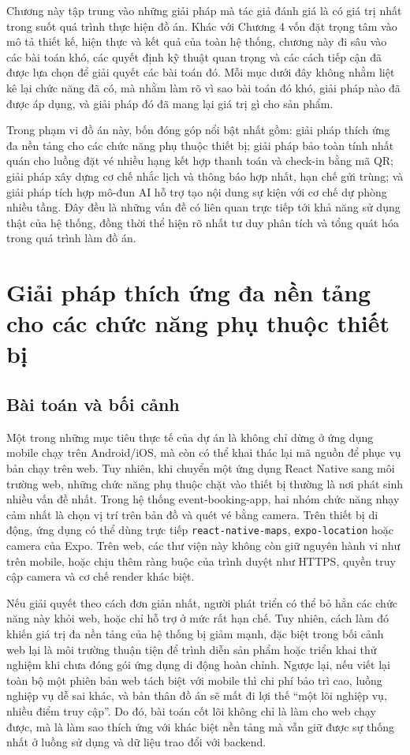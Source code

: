 \documentclass[../DoAn.tex]{subfiles}
\begin{document}
Chương này tập trung vào những giải pháp mà tác giả đánh giá là có giá trị nhất trong suốt quá trình thực hiện đồ án. Khác với Chương 4 vốn đặt trọng tâm vào mô tả thiết kế, hiện thực và kết quả của toàn hệ thống, chương này đi sâu vào các bài toán khó, các quyết định kỹ thuật quan trọng và các cách tiếp cận đã được lựa chọn để giải quyết các bài toán đó. Mỗi mục dưới đây không nhằm liệt kê lại chức năng đã có, mà nhằm làm rõ vì sao bài toán đó khó, giải pháp nào đã được áp dụng, và giải pháp đó đã mang lại giá trị gì cho sản phẩm.

Trong phạm vi đồ án này, bốn đóng góp nổi bật nhất gồm: giải pháp thích ứng đa nền tảng cho các chức năng phụ thuộc thiết bị; giải pháp bảo toàn tính nhất quán cho luồng đặt vé nhiều hạng kết hợp thanh toán và check-in bằng mã \gls{QR}; giải pháp xây dựng cơ chế nhắc lịch và thông báo hợp nhất, hạn chế gửi trùng; và giải pháp tích hợp mô-đun AI hỗ trợ tạo nội dung sự kiện với cơ chế dự phòng nhiều tầng. Đây đều là những vấn đề có liên quan trực tiếp tới khả năng sử dụng thật của hệ thống, đồng thời thể hiện rõ nhất tư duy phân tích và tổng quát hóa trong quá trình làm đồ án.

\section{Giải pháp thích ứng đa nền tảng cho các chức năng phụ thuộc thiết bị}
\label{sec:solution-cross-platform}

\subsection{Bài toán và bối cảnh}
Một trong những mục tiêu thực tế của dự án là không chỉ dừng ở ứng dụng mobile chạy trên Android/iOS, mà còn có thể khai thác lại mã nguồn để phục vụ bản chạy trên web. Tuy nhiên, khi chuyển một ứng dụng React Native sang môi trường web, những chức năng phụ thuộc chặt vào thiết bị thường là nơi phát sinh nhiều vấn đề nhất. Trong hệ thống event-booking-app, hai nhóm chức năng nhạy cảm nhất là chọn vị trí trên bản đồ và quét vé bằng camera. Trên thiết bị di động, ứng dụng có thể dùng trực tiếp \texttt{react-native-maps}, \texttt{expo-location} hoặc camera của Expo. Trên web, các thư viện này không còn giữ nguyên hành vi như trên mobile, hoặc chịu thêm ràng buộc của trình duyệt như \gls{HTTPS}, quyền truy cập camera và cơ chế render khác biệt.

Nếu giải quyết theo cách đơn giản nhất, người phát triển có thể bỏ hẳn các chức năng này khỏi web, hoặc chỉ hỗ trợ ở mức rất hạn chế. Tuy nhiên, cách làm đó khiến giá trị đa nền tảng của hệ thống bị giảm mạnh, đặc biệt trong bối cảnh web lại là môi trường thuận tiện để trình diễn sản phẩm hoặc triển khai thử nghiệm khi chưa đóng gói ứng dụng di động hoàn chỉnh. Ngược lại, nếu viết lại toàn bộ một phiên bản web tách biệt với mobile thì chi phí bảo trì cao, luồng nghiệp vụ dễ sai khác, và bản thân đồ án sẽ mất đi lợi thế “một lõi nghiệp vụ, nhiều điểm truy cập”. Do đó, bài toán cốt lõi không chỉ là làm cho web chạy được, mà là làm sao thích ứng với khác biệt nền tảng mà vẫn giữ được sự thống nhất ở luồng sử dụng và dữ liệu trao đổi với backend.
\end{document}
